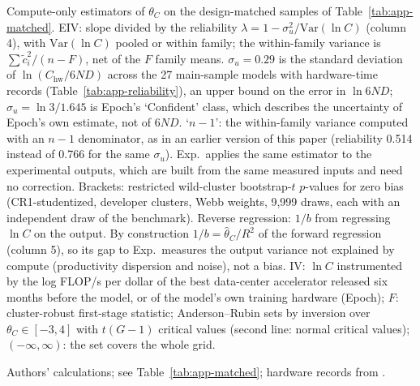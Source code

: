 \begin{table}[tp]
\begin{tablenotes}
Compute-only estimators of $\theta_C$ on the design-matched samples of Table~\ref{tab:app-matched}. EIV: slope divided by the reliability $\lambda=1-\sigma_u^2/\text{Var}(\ln C)$ (column 4), with $\text{Var}(\ln C)$ pooled or within family; the within-family variance is $\sum\tilde c_i^2/(n-F)$, net of the $F$ family means. $\sigma_u=0.29$ is the standard deviation of $\ln(C_{\text{hw}}/6ND)$ across the 27 main-sample models with hardware-time records (Table~\ref{tab:app-reliability}), an upper bound on the error in $\ln 6ND$; $\sigma_u=\ln3/1.645$ is Epoch's `Confident' class, which describes the uncertainty of Epoch's own estimate, not of $6ND$. `$n-1$': the within-family variance computed with an $n-1$ denominator, as in an earlier version of this paper (reliability 0.514 instead of 0.766 for the same $\sigma_u$). Exp.\ applies the same estimator to the experimental outputs, which are built from the same measured inputs and need no correction. Brackets: restricted wild-cluster bootstrap-$t$ $p$-values for zero bias (CR1-studentized, developer clusters, Webb weights, 9,999 draws, each with an independent draw of the benchmark). Reverse regression: $1/b$ from regressing $\ln C$ on the output. By construction $1/b=\hat\theta_C/R^2$ of the forward regression (column 5), so its gap to Exp.\ measures the output variance not explained by compute (productivity dispersion and noise), not a bias. IV: $\ln C$ instrumented by the log FLOP/s per dollar of the best data-center accelerator released six months before the model, or of the model's own training hardware (Epoch); $F$: cluster-robust first-stage statistic; Anderson--Rubin sets by inversion over $\theta_C\in[-3,4]$ with $t(G-1)$ critical values (second line: normal critical values); $(-\infty,\infty)$: the set covers the whole grid.
\end{tablenotes}
\begin{tablenotes}[Source]
Authors' calculations; see Table~\ref{tab:app-matched}; hardware records from \citet{epochai2026data}.
\end{tablenotes}
\end{table}
